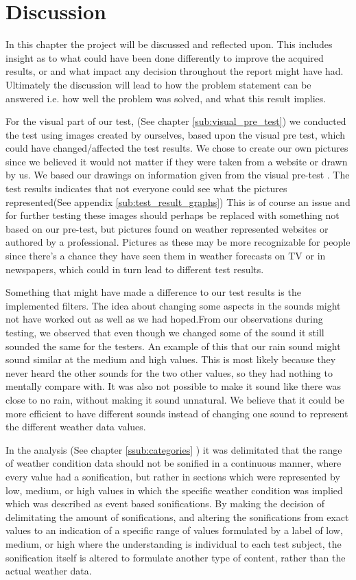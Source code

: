 
\section{Discussion} %
\label{sec:discussion}

In this chapter the project will be discussed and reflected upon. 
This includes insight as to what could have been done differently to improve the acquired results, or and what impact any decision throughout the report might have had. 
Ultimately the discussion will lead to how the problem statement can be answered i.e. how well the problem was solved, and what this result implies.

For the visual part of our test, (See chapter \ref{sub:visual_pre_test}) we conducted the test using images created by ourselves, based upon the visual pre test, which could have changed/affected the test results. We chose to create our own pictures since we believed it would not matter if they were taken from a website or drawn by us. We based our drawings on information given from the visual pre-test . The test results indicates that not everyone could see what the pictures represented(See appendix \ref{sub:test_result_graphs}) This is of course an issue and for further testing these images should perhaps be replaced with something not based on our pre-test, but pictures found on weather represented websites or authored by a professional. Pictures as these may be more recognizable for people since there’s a chance they have seen them in weather forecasts on TV or in newspapers, which could in turn lead to different test results.


Something that might have made a difference to our test results is the implemented filters. The idea about changing some aspects in the sounds might not have worked out as well as we had hoped.From our observations during testing, we observed that even though we changed some of the sound it still sounded the same for the testers. An example of this that our rain sound might sound similar at the medium and high values. This is most likely because they never heard the other sounds for the two other values, so they had nothing to mentally compare with. It was also not possible to make it sound like there was close to no rain, without making it sound unnatural. We believe that it could be more efficient to have different sounds instead of changing one sound to represent the different weather data values.


In the analysis (See chapter \ref{ssub:categories} ) it was delimitated that the range of weather condition data should not be sonified in a continuous manner, where every value had a sonification, but rather in sections which were represented by low, medium, or high values in which the specific weather condition was implied which was described as event based sonifications. 
By making the decision of delimitating the amount of sonifications, and altering the sonifications from exact values to an indication of a specific range of values formulated by a label of low, medium, or high where the understanding is individual to each test subject, the sonification itself is altered to formulate another type of content, rather than the actual weather data. 

